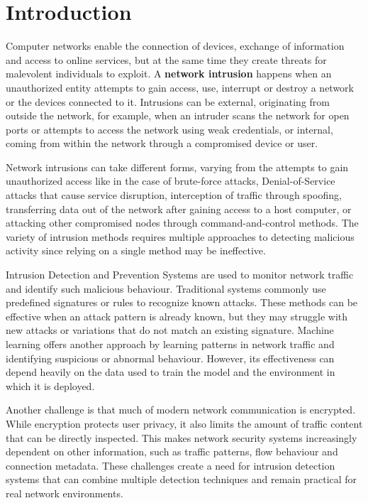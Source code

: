 \chapter{Introduction}\label{chap:1}

\noindent Computer networks enable the connection of devices, exchange of information and access to online services, but at the same time they create threats for malevolent individuals to exploit. A \textbf{network intrusion} happens when an unauthorized entity attempts to gain access, use, interrupt or destroy a network or the devices connected to it. Intrusions can be external, originating from outside the network, for example, when an intruder scans the network for open ports or attempts to access the network using weak credentials, or internal, coming from within the network through a compromised device or user.

\noindent Network intrusions can take different forms, varying from the attempts to gain unauthorized access like in the case of brute-force attacks, Denial-of-Service attacks that cause service disruption, interception of traffic through spoofing, transferring data out of the network after gaining access to a host computer, or attacking other compromised nodes through command-and-control methods. The variety of intrusion methods requires multiple approaches to detecting malicious activity since relying on a single method may be ineffective.

\noindent Intrusion Detection and Prevention Systems are used to monitor network traffic and identify such malicious behaviour. Traditional systems commonly use predefined signatures or rules to recognize known attacks. These methods can be effective when an attack pattern is already known, but they may struggle with new attacks or variations that do not match an existing signature. Machine learning offers another approach by learning patterns in network traffic and identifying suspicious or abnormal behaviour. However, its effectiveness can depend heavily on the data used to train the model and the environment in which it is deployed.

\noindent Another challenge is that much of modern network communication is encrypted. While encryption protects user privacy, it also limits the amount of traffic content that can be directly inspected. This makes network security systems increasingly dependent on other information, such as traffic patterns, flow behaviour and connection metadata. These challenges create a need for intrusion detection systems that can combine multiple detection techniques and remain practical for real network environments.

